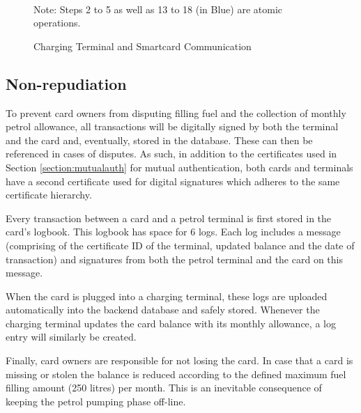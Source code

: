 \documentclass[a4paper,10pt]{llncs}
\begin{document}
\begin{figure}[h!]
\\Note: Steps 2 to 5 as well as 13 to 18 (in Blue) are atomic operations.
\caption{\label{figure:charging}Charging Terminal and Smartcard Communication}
\end{figure}



\subsection{Non-repudiation}
\label{subsection:nonrepud}
To prevent card owners from disputing filling fuel and the collection of monthly petrol allowance, all transactions will be digitally signed by both the terminal and the card and, eventually, stored in the database. These can then be referenced in cases of disputes. As such, in addition to the certificates used in Section \ref{section:mutualauth} for mutual authentication, both cards and terminals have a second certificate used for digital signatures which adheres to the same certificate hierarchy.

Every transaction between a card and a petrol terminal is first stored in the card's logbook. This logbook has space for 6 logs. Each log includes a message (comprising of the certificate ID of the terminal, updated balance and the date of transaction) and signatures from both the petrol terminal and the card on this message.

When the card is plugged into a charging terminal, these logs are uploaded automatically into the backend database and safely stored. Whenever the charging terminal updates the card balance with its monthly allowance, a log entry will similarly be created.

Finally, card owners are responsible for not losing the card. In case that a card is missing or stolen the balance is reduced according to the defined maximum fuel filling amount (250 litres) per month. This is an inevitable consequence of keeping the petrol pumping phase off-line.
\end{document}
